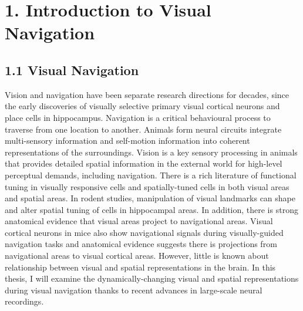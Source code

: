 \chapter{1. Introduction to Visual Navigation}
\label{chapterlabel1}

\section{1.1 Visual Navigation}
Vision and navigation have been separate research directions for decades, since the early discoveries of visually selective primary visual cortical neurons and place cells in hippocampus. Navigation is a critical behavioural process to traverse from one location to another. Animals form neural circuits integrate multi-sensory information and self-motion information into coherent representations of the surroundings. Vision is a key sensory processing in animals that provides detailed spatial information in the external world for high-level perceptual demands, including navigation. There is a rich literature of functional tuning in visually responsive cells and spatially-tuned cells in both visual areas and spatial areas. In rodent studies, manipulation of visual landmarks can shape and alter spatial tuning of cells in hippocampal areas. In addition, there is strong anatomical evidence that visual areas project to navigational areas. Visual cortical neurons in mice also show navigational signals during visually-guided navigation tasks and anatomical evidence suggests there is projections from navigational areas to visual cortical areas. However, little is known about relationship between visual and spatial representations in the brain. In this thesis, I will examine the dynamically-changing visual and spatial representations during visual navigation thanks to recent advances in large-scale neural recordings.


